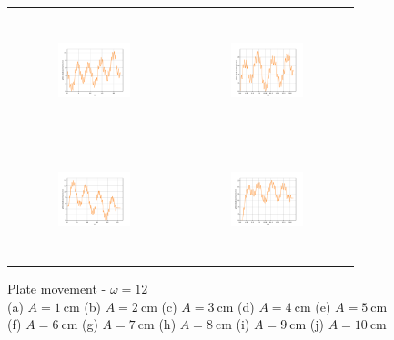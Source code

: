 \begin{figure}[H]
\begin{center}
\begin{tabular}{cc}
\includegraphics[width=0.45\textwidth, height=3.5cm]{graph/omega=3.50_A=7_plate.pdf}
&
\includegraphics[width=0.45\textwidth, height=3.5cm]{graph/omega=3.50_A=8_plate.pdf}\\
\includegraphics[width=0.45\textwidth, height=3.5cm]{graph/omega=3.50_A=9_plate.pdf}
&
\includegraphics[width=0.45\textwidth, height=3.5cm]{graph/omega=3.50_A=10_plate.pdf}\\
\end{tabular}
\end{center}
\caption{Plate movement - $\omega=12$ \\ (a) $A=1\mathrm{~cm}$ (b) $A=2\mathrm{~cm}$ (c) $A=3\mathrm{~cm}$ (d) $A=4\mathrm{~cm}$ (e) $A=5\mathrm{~cm}$\\(f) $A=6\mathrm{~cm}$ (g) $A=7\mathrm{~cm}$ (h) $A=8\mathrm{~cm}$ (i) $A=9\mathrm{~cm}$ (j) $A=10\mathrm{~cm}$}
\label{Data_omega=12_plate}
\end{figure}

